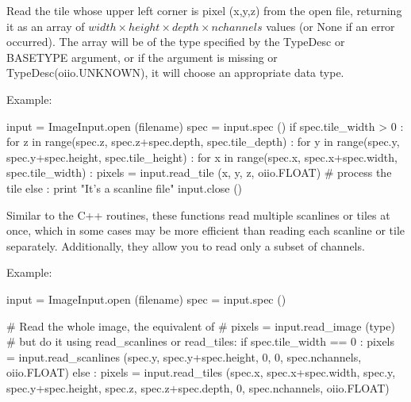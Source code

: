 Read the tile whose upper left corner is pixel {\cf (x,y,z)} from the open
file, returning it as an array of
$\mathit{width} \times \mathit{height} \times \mathit{depth} \times \mathit{nchannels}$
values (or {\cf None} if an error occurred). The array will be of the type
specified by the {\cf TypeDesc} or {\cf BASETYPE} argument, or if the
argument is missing or {\cf TypeDesc(oiio.UNKNOWN)}, it will choose an
appropriate data type.

\noindent Example:
\begin{code}
    input = ImageInput.open (filename)
    spec = input.spec ()
    if spec.tile_width > 0 :
        for z in range(spec.z, spec.z+spec.depth, spec.tile_depth) :
            for y in range(spec.y, spec.y+spec.height, spec.tile_height) :
                for x in range(spec.x, spec.x+spec.width, spec.tile_width) :
                    pixels = input.read_tile (x, y, z, oiio.FLOAT)
                    # process the tile
    else :
        print "It's a scanline file"
    input.close ()
\end{code}
\apiend

Similar to the C++ routines, these functions read multiple scanlines or 
tiles at once, which in some cases may be more efficient than reading
each scanline or tile separately.  Additionally, they allow you to read only
a subset of channels.

\noindent Example:
\begin{code}
    input = ImageInput.open (filename)
    spec = input.spec ()

    # Read the whole image, the equivalent of
    #     pixels = input.read_image (type)
    # but do it using read_scanlines or read_tiles:
    if spec.tile_width == 0 :
        pixels = input.read_scanlines (spec.y, spec.y+spec.height, 0,
                                       0, spec.nchannels, oiio.FLOAT)
    else :
        pixels = input.read_tiles (spec.x, spec.x+spec.width,
                                   spec.y, spec.y+spec.height,
                                   spec.z, spec.z+spec.depth,
                                   0, spec.nchannels, oiio.FLOAT)
\end{code}
\apiend


